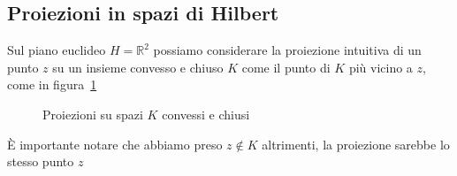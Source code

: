 \subsection{Proiezioni in spazi di Hilbert}

Sul piano euclideo \(H = \mathbb{R}^2\) possiamo considerare la proiezione intuitiva
di un punto \(z\) su un insieme convesso e chiuso \(K\) come il punto di \(K\) più
vicino a \(z\), come in figura~\ref{fig:teorema-delle-proiezioni}
\begin{figure}[ht]
    \centering
    \caption{Proiezioni su spazi \(K\) convessi e chiusi}
    \label{fig:teorema-delle-proiezioni}
\end{figure}
È importante notare che abbiamo preso \(z \not\in  K\) altrimenti, la proiezione
sarebbe lo stesso punto \(z\) 

